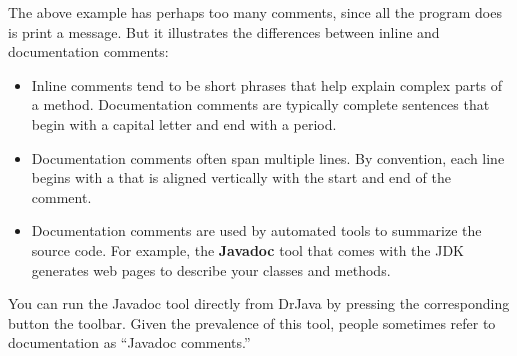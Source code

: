 The above example has perhaps too many comments, since all the program does is print a message.
But it illustrates the differences between inline and documentation comments:

\begin{itemize}
\item Inline comments tend to be short phrases that help explain complex parts of a method.
Documentation comments are typically complete sentences that begin with a capital letter and end with a period.

\item Documentation comments often span multiple lines.
By convention, each line begins with a {\tt *} that is aligned vertically with the start and end of the comment.



\item Documentation comments are used by automated tools to summarize the source code.
For example, the {\bf Javadoc} tool that comes with the JDK generates web pages to describe your classes and methods.

\end{itemize}

You can run the Javadoc tool directly from DrJava by pressing the corresponding button the toolbar.
Given the prevalence of this tool, people sometimes refer to documentation as ``Javadoc comments.''

